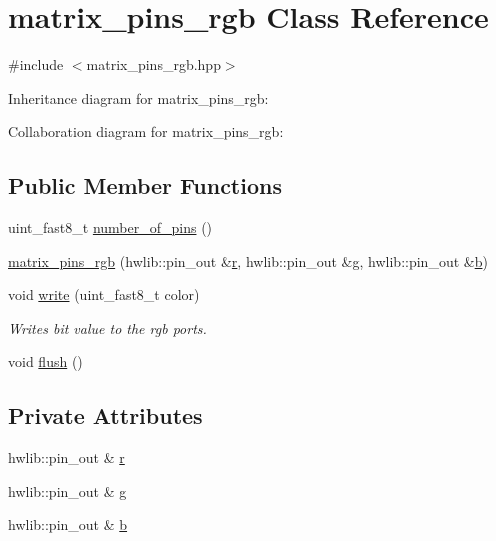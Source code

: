 \hypertarget{classmatrix__pins__rgb}{}\section{matrix\+\_\+pins\+\_\+rgb Class Reference}
\label{classmatrix__pins__rgb}


{\ttfamily \#include $<$matrix\+\_\+pins\+\_\+rgb.\+hpp$>$}



Inheritance diagram for matrix\+\_\+pins\+\_\+rgb\+:


Collaboration diagram for matrix\+\_\+pins\+\_\+rgb\+:
\subsection*{Public Member Functions}
\begin{DoxyCompactItemize}
\item 
uint\+\_\+fast8\+\_\+t \hyperlink{classmatrix__pins__rgb_adcb58fe638967b23f72cc505d8bd8019}{number\+\_\+of\+\_\+pins} ()
\item 
\hyperlink{classmatrix__pins__rgb_ac02033d27280314ad8e1d6b4b9b4c2cf}{matrix\+\_\+pins\+\_\+rgb} (hwlib\+::pin\+\_\+out \&\hyperlink{classmatrix__pins__rgb_a828561dc648f33d89d1156ada856924f}{r}, hwlib\+::pin\+\_\+out \&\hyperlink{classmatrix__pins__rgb_ad6fb34fc8a4c10d0a39631d9b5894330}{g}, hwlib\+::pin\+\_\+out \&\hyperlink{classmatrix__pins__rgb_ab720e7705783585a446a2bb47b6ad5d8}{b})
\item 
void \hyperlink{classmatrix__pins__rgb_ad5dd647ecfb37502f95c9255072ac516}{write} (uint\+\_\+fast8\+\_\+t color)
\begin{DoxyCompactList}\small\item\em Writes bit value to the rgb ports. \end{DoxyCompactList}\item 
void \hyperlink{classmatrix__pins__rgb_a79174576ae97424811a431bfec08c72c}{flush} ()
\end{DoxyCompactItemize}
\subsection*{Private Attributes}
\begin{DoxyCompactItemize}
\item 
hwlib\+::pin\+\_\+out \& \hyperlink{classmatrix__pins__rgb_a828561dc648f33d89d1156ada856924f}{r}
\item 
hwlib\+::pin\+\_\+out \& \hyperlink{classmatrix__pins__rgb_ad6fb34fc8a4c10d0a39631d9b5894330}{g}
\item 
hwlib\+::pin\+\_\+out \& \hyperlink{classmatrix__pins__rgb_ab720e7705783585a446a2bb47b6ad5d8}{b}
\end{DoxyCompactItemize}


